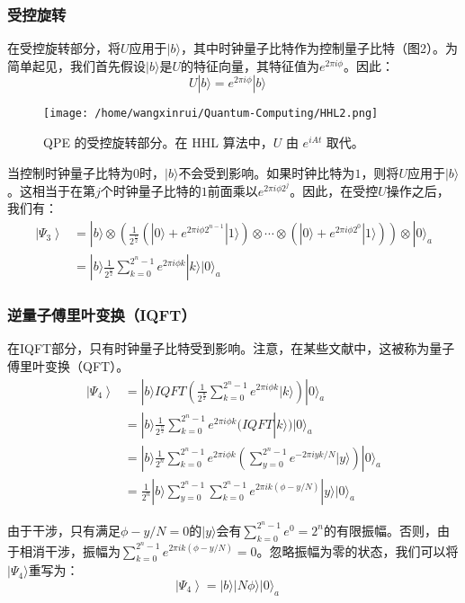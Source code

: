 \documentclass{article}
\begin{document}
\subsubsection{受控旋转}
在受控旋转部分，将$U$应用于$|b\rangle$，其中时钟量子比特作为控制量子比特（图2）。为简单起见，我们首先假设$|b\rangle$是$U$的特征向量，其特征值为$e^{2 \pi i \phi}$。因此：
\[
U|b\rangle=e^{2 \pi i \phi}|b\rangle \quad
\]
\begin{figure}[htbp]
    \centering
    \texttt{[image: /home/wangxinrui/Quantum-Computing/HHL2.png]}
    \caption{QPE 的受控旋转部分。在 HHL 算法中，$U$ 由 $e^{iAt}$ 取代。}
\end{figure}
当控制时钟量子比特为$0$时，$|b\rangle$不会受到影响。如果时钟比特为$1$，则将$U$应用于$|b\rangle$。这相当于在第$j$个时钟量子比特的$1$前面乘以$e^{2 \pi i \phi 2^{j}}$。因此，在受控$U$操作之后，我们有：
\[\begin{aligned} 
\left|\Psi_{3}\right> & =|b\rangle \otimes\left(\frac{1}{2^{\frac{n}{2}}}\left(|0\rangle+e^{2 \pi i \phi 2^{n-1}}|1\rangle\right)\otimes \cdots \otimes\left(|0\rangle+e^{2 \pi i \phi 2^{0}}|1\rangle\right)\right) \otimes|0\rangle_{a} \\ 
& =|b\rangle \frac{1}{2^{\frac{n}{2}}} \sum_{k=0}^{2^{n}-1} e^{2 \pi i \phi k}|k\rangle|0\rangle_{a} 
\end{aligned}\]
\subsubsection{逆量子傅里叶变换（IQFT）}
在IQFT部分，只有时钟量子比特受到影响。注意，在某些文献中，这被称为量子傅里叶变换（QFT）。
\[
\begin{aligned} 
\left|\Psi_{4}\right> & =|b\rangle I Q F T\left(\frac{1}{2^{\frac{n}{2}}} \sum_{k=0}^{2^{n}-1} e^{2 \pi i \phi k}|k\rangle\right)|0\rangle_{a} \\ 
& =|b\rangle \frac{1}{2^{\frac{n}{2}}} \sum_{k=0}^{2^{n}-1} e^{2 \pi i \phi k}(I Q F T|k\rangle)|0\rangle_{a} \\ 
& =|b\rangle \frac{1}{2^{n}} \sum_{k=0}^{2^{n}-1} e^{2 \pi i \phi k}\left(\sum_{y=0}^{2^{n}-1} e^{-2 \pi i y k / N}|y\rangle\right)|0\rangle_{a} \\ 
& =\frac{1}{2^{n}}|b\rangle \sum_{y=0}^{2^{n}-1} \sum_{k=0}^{2^{n}-1} e^{2 \pi i k(\phi-y / N)}|y\rangle|0\rangle_{a} 
\end{aligned}
\]

由于干涉，只有满足$\phi - y/N=0$的$|y\rangle$会有$\sum_{k=0}^{2^{n}-1} e^{0}=2^{n}$的有限振幅。否则，由于相消干涉，振幅为$\sum_{k=0}^{2^{n}-1} e^{2 \pi i k(\phi - y/N)}=0$。忽略振幅为零的状态，我们可以将$|\Psi_{4}\rangle$重写为：
\[
\left|\Psi_{4}\right>=|b\rangle|N \phi\rangle|0\rangle_{a} \quad
\]
\end{document}
